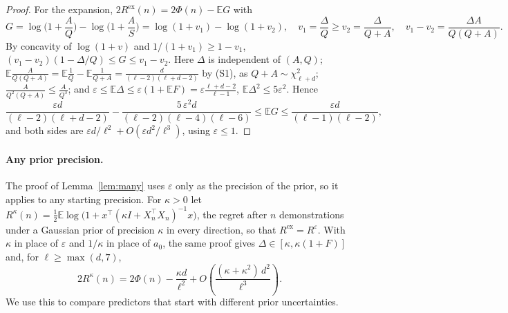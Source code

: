 \documentclass{article}
\newcommand{\E}{\mathbb{E}}
\begin{document}
\begin{proof}
For the expansion, $2R^{\mathrm{ex}}(n) = 2\Phi(n) - \E G$ with
\[
G = \log\Big(1 + \frac{A}{Q}\Big) - \log\Big(1 + \frac{A}{S}\Big) = \log(1 + v_1) - \log(1 + v_2), \quad v_1 = \frac{\Delta}{Q} \ge v_2 = \frac{\Delta}{Q + A}, \quad v_1 - v_2 = \frac{\Delta A}{Q(Q+A)} .
\]
By concavity of $\log(1+v)$ and $1/(1+v_1) \ge 1 - v_1$, $(v_1 - v_2)(1 - \Delta/Q) \le G \le v_1 - v_2$. Here $\Delta$ is independent of $(A, Q)$; $\E \frac{A}{Q(Q+A)} = \E\frac1Q - \E\frac{1}{Q+A} = \frac{d}{(\ell-2)(\ell+d-2)}$ by (S1), as $Q + A \sim \chi^2_{\ell+d}$; $\frac{A}{Q^2(Q+A)} \le \frac{A}{Q^3}$; and $\varepsilon \le \E\Delta \le \varepsilon(1 + \E F) = \varepsilon\frac{\ell+d-2}{\ell-1}$, $\E \Delta^2 \le 5\varepsilon^2$. Hence
\[
\frac{\varepsilon d}{(\ell-2)(\ell+d-2)} - \frac{5\,\varepsilon^2 d}{(\ell-2)(\ell-4)(\ell-6)} \le \E G \le \frac{\varepsilon d}{(\ell-1)(\ell-2)} ,
\]
and both sides are $\varepsilon d / \ell^2 + O(\varepsilon d^2 / \ell^3)$, using $\varepsilon \le 1$.
\end{proof}

\paragraph{Any prior precision.}
The proof of Lemma~\ref{lem:many} uses $\varepsilon$ only as the precision of the prior, so it applies to any starting precision. For $\kappa > 0$ let $R^{\kappa}(n) = \tfrac12 \E \log\big(1 + x^\top (\kappa I + X_n^\top X_n)^{-1} x\big)$, the regret after $n$ demonstrations under a Gaussian prior of precision $\kappa$ in every direction, so that $R^{\mathrm{ex}} = R^{\varepsilon}$. With $\kappa$ in place of $\varepsilon$ and $1/\kappa$ in place of $a_0$, the same proof gives $\Delta \in [\kappa, \kappa(1+F)]$ and, for $\ell \ge \max(d, 7)$,
\begin{equation}\label{eq:any-tau}
2R^{\kappa}(n) = 2\Phi(n) - \frac{\kappa d}{\ell^2} + O\!\left(\frac{(\kappa + \kappa^2)\, d^2}{\ell^3}\right).
\end{equation}
We use this to compare predictors that start with different prior uncertainties.
\end{document}
